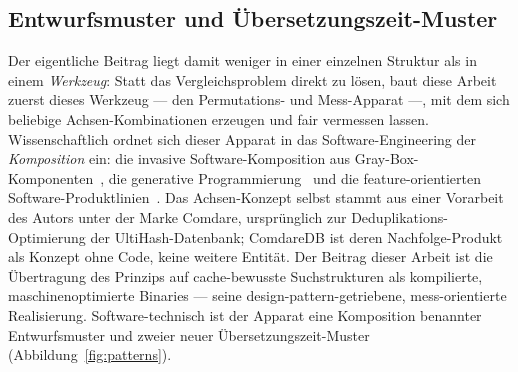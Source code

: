 \begin{nurlang}
\subsection{Entwurfsmuster und Übersetzungszeit-Muster}\label{sec:anatomy-patterns}
Der eigentliche Beitrag liegt damit weniger in einer einzelnen Struktur als in einem \emph{Werkzeug}:
Statt das Vergleichsproblem direkt zu lösen, baut diese Arbeit zuerst dieses Werkzeug --- den
Permutations- und Mess-Apparat ---, mit dem sich beliebige Achsen-Kombinationen erzeugen und fair
vermessen lassen. Wissenschaftlich ordnet sich dieser Apparat in das Software-Engineering der
\emph{Komposition} ein: die invasive Software-Komposition aus Gray-Box-Komponenten~\cite{assmann2003invasive},
die generative Programmierung~\cite{czarnecki2000generative} und die feature-orientierten
Software-Produktlinien~\cite{apel2013feature,batory1992hierarchical}. Das Achsen-Konzept selbst stammt aus
einer Vorarbeit des Autors unter der Marke Comdare, ursprünglich zur Deduplikations-Optimierung der
UltiHash-Datenbank; ComdareDB ist deren Nachfolge-Produkt als Konzept ohne Code, keine weitere Entität.
Der Beitrag dieser Arbeit ist die Übertragung des Prinzips auf cache-bewusste Suchstrukturen als
kompilierte, maschinenoptimierte Binaries --- seine design-pattern-getriebene, mess-orientierte
Realisierung. Software-technisch ist
der Apparat eine Komposition benannter Entwurfsmuster und zweier neuer Übersetzungszeit-Muster
(Abbildung~\ref{fig:patterns}).
\begin{figure}[htbp]\centering
{}
\end{figure}
\end{nurlang}
